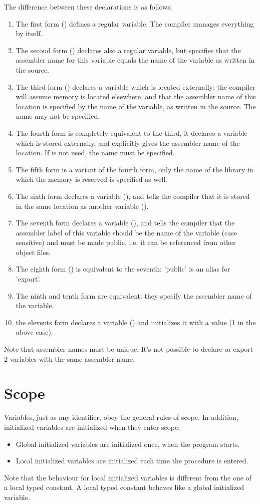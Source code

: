 The difference between these declarations is as follows:
\begin{enumerate}
\item The first form () defines a regular variable. The
compiler manages everything by itself.
\item The second form () declares also a regular variable, 
but specifies that the assembler name for this variable equals the name 
of the variable as written in the source.
\item The third form () declares a variable which is located
externally: the compiler will assume memory is located elsewhere, and that
the assembler name of this location is specified by the name of the
variable, as written in the source. The name may not be specified.
\item The fourth form is completely equivalent to the third, it declares a
variable which is stored externally, and explicitly gives the assembler
name of the location. If  is not used, the name must be specified.
\item The fifth form is a variant of the fourth form, only the name of the
library in which the memory is reserved is specified as well.
\item The sixth form declares a variable (), and tells the compiler that it is
stored in the same location as another variable ().
\item The seventh form declares a variable (), and tells the
compiler that the assembler label of this variable should be the name of the
variable (case sensitive) and must be made public. i.e. it can be
referenced from other object files.
\item The eighth form () is equivalent to the seventh: 'public'
is an alias for 'export'.
\item The ninth and tenth form are equivalent: they specify the assembler 
name of the variable.
\item the elevents form declares a variable () and
initializes it with a value (1 in the above case).
\end{enumerate}
Note that assembler names must be unique. It's not possible to declare or 
export 2 variables with the same assembler name.

\section{Scope}
Variables, just as any identifier, obey the general rules of scope. 
In addition, initialized variables are initialized when they enter scope:
\begin{itemize}
\item Global initialized variables are initialized once, when the program starts.
\item Local initialized variables are initialized each time the procedure is
entered.
\end{itemize}
Note that the behaviour for local initialized variables is different from
the one of a local typed constant. A local typed constant behaves like a
global initialized variable.

